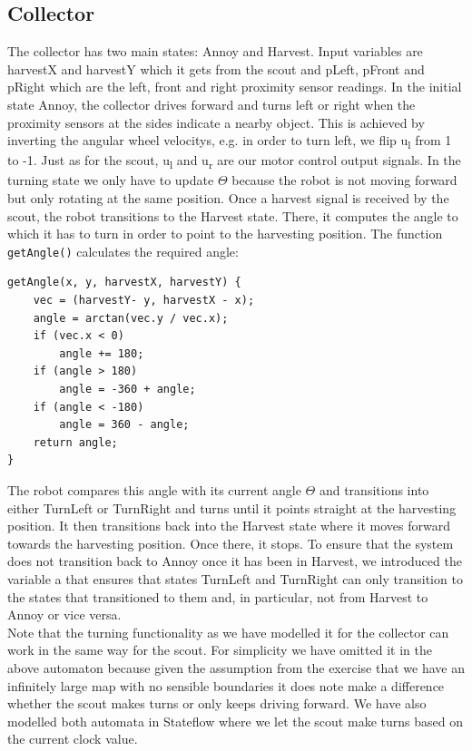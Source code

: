 \documentclass[12pt]{article}
\begin{document}
\subsection* {Collector}
The collector has two main states: Annoy and Harvest. Input variables are harvestX and harvestY which it gets from the scout and pLeft, pFront and pRight which are the left, front and right proximity sensor readings. In the initial state Annoy, the collector drives forward and turns left or right when the proximity sensors at the sides indicate a nearby object. This is achieved by inverting the angular wheel velocitys, e.g. in order to turn left, we flip u\textsubscript{l} from 1 to -1. Just as for the scout, u\textsubscript{l} and u\textsubscript{r} are our motor control output signals. In the turning state we only have to update $\Theta$ because the robot is not moving forward but only rotating at the same position. Once a harvest signal is received by the scout, the robot transitions to the Harvest state. There, it computes the angle to which it has to turn in order to point to the harvesting position. The function \verb!getAngle()! calculates the required angle:
\begin{lstlisting}
getAngle(x, y, harvestX, harvestY) {
    vec = (harvestY- y, harvestX - x);
    angle = arctan(vec.y / vec.x);
    if (vec.x < 0) 
        angle += 180;
    if (angle > 180) 
        angle = -360 + angle;
    if (angle < -180) 
        angle = 360 - angle;
    return angle;
}
\end{lstlisting}
The robot compares this angle with its current angle $\Theta$  and transitions into either TurnLeft or TurnRight and turns until it points straight at the harvesting position. It then transitions back into the Harvest state where it moves forward towards the harvesting position. Once there, it stops. To ensure that the system does not transition back to Annoy once it has been in Harvest, we introduced the variable a that ensures that states TurnLeft and TurnRight can only transition to the states that transitioned to them and, in particular, not from Harvest to Annoy or vice versa.\\
Note that the turning functionality as we have modelled it for the collector can work in the same way for the scout. For simplicity we have omitted it in the above automaton because given the assumption from the exercise that we have an infinitely large map with no sensible boundaries it does note make a difference whether the scout makes turns or only keeps driving forward. We have also modelled both automata in Stateflow where we let the scout make turns based on the current clock value.\\
\end{document}
